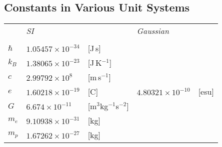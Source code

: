 \documentclass[12pt]{book}
\theoremstyle{definition}
\newenvironment{frontstuff}
  {\centering\chapter*{}}
  {\clearpage}
\begin{document}
\begin{frontstuff}
\section*{Constants in Various Unit Systems}
\begin{tabularx}{\linewidth}{LlLll}
 & {\it SI} && {\it Gaussian}&\\ 
\vspace{2mm}\\
$\hbar$  & $1.05457\times 10^{-34}$ & [J\,s]
         & & \\
$k_B$    & $1.38065\times 10^{-23}$ & [J\,K$^{-1}$]
         & & \\
$c$      & $2.99792\times 10^8$ & [m\,s$^{-1}$]
         & & \\
$e$      & $1.60218\times 10^{-19}$ & [C] 
         & $4.80321\times 10^{-10}$ & [esu]\\
$G$      & $6.674\times 10^{-11}$ & [m$^3$kg$^{-1}$s$^{-2}$]
         & & \\
$m_e$    & $9.10938\times 10^{-31}$ & [kg]
         & & \\
$m_p$    & $1.67262\times 10^{-27}$ & [kg]
         & & \\
\end{tabularx}
\clearpage


\end{frontstuff}
\end{document}
